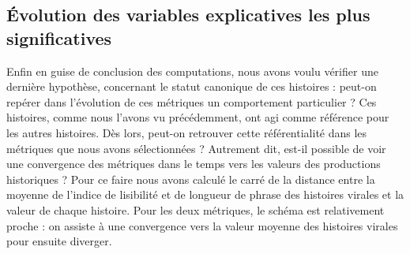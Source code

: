 \documentclass[12pt,a4paper,oneside,titlepage]{book} %
\begin{document}
\subsection{Évolution des variables explicatives les plus significatives}
Enfin en guise de conclusion des computations, nous avons voulu vérifier une dernière hypothèse, concernant le statut canonique de ces histoires : peut-on repérer dans l'évolution de ces métriques un comportement particulier ?
Ces histoires, comme nous l'avons vu précédemment, ont agi comme référence pour les autres histoires. Dès lors, peut-on retrouver cette référentialité dans les métriques que nous avons sélectionnées ? Autrement dit, est-il possible de voir une convergence des métriques dans le temps vers les valeurs des productions historiques ? 
Pour ce faire nous avons calculé le carré de la distance entre la moyenne de l'indice de lisibilité et de longueur de phrase des histoires virales et la valeur de chaque histoire. 
Pour les deux métriques, le schéma est relativement proche : on assiste à une convergence vers la valeur moyenne des histoires virales pour ensuite diverger. 
\end{document}
